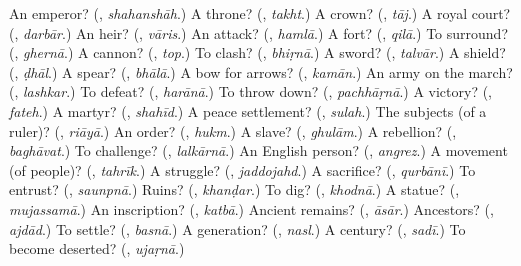 \begin{tcolorbox}[breakable,colback=teal!4,colframe=teal!35!black,title={Before you move on}]
An emperor? (\textbf{}, \emph{shahanshāh}.) A throne? (\textbf{}, \emph{takht}.) A crown? (\textbf{}, \emph{tāj}.) A royal court? (\textbf{}, \emph{darbār}.) An heir? (\textbf{}, \emph{vāris}.) An attack? (\textbf{}, \emph{hamlā}.) A fort? (\textbf{}, \emph{qilā}.) To surround? (\textbf{}, \emph{ghernā}.) A cannon? (\textbf{}, \emph{top}.) To clash? (\textbf{}, \emph{bhiṛnā}.) A sword? (\textbf{}, \emph{talvār}.) A shield? (\textbf{}, \emph{ḍhāl}.) A spear? (\textbf{}, \emph{bhālā}.) A bow for arrows? (\textbf{}, \emph{kamān}.) An army on the march? (\textbf{}, \emph{lashkar}.) To defeat? (\textbf{}, \emph{harānā}.) To throw down? (\textbf{}, \emph{pachhāṛnā}.) A victory? (\textbf{}, \emph{fateh}.) A martyr? (\textbf{}, \emph{shahīd}.) A peace settlement? (\textbf{}, \emph{sulah}.) The subjects (of a ruler)? (\textbf{}, \emph{riāyā}.) An order? (\textbf{}, \emph{hukm}.) A slave? (\textbf{}, \emph{ghulām}.) A rebellion? (\textbf{}, \emph{baghāvat}.) To challenge? (\textbf{}, \emph{lalkārnā}.) An English person? (\textbf{}, \emph{angrez}.) A movement (of people)? (\textbf{}, \emph{tahrīk}.) A struggle? (\textbf{}, \emph{jaddojahd}.) A sacrifice? (\textbf{}, \emph{qurbānī}.) To entrust? (\textbf{}, \emph{saunpnā}.) Ruins? (\textbf{}, \emph{khanḍar}.) To dig? (\textbf{}, \emph{khodnā}.) A statue? (\textbf{}, \emph{mujassamā}.) An inscription? (\textbf{}, \emph{katbā}.) Ancient remains? (\textbf{}, \emph{āsār}.) Ancestors? (\textbf{}, \emph{ajdād}.) To settle? (\textbf{}, \emph{basnā}.) A generation? (\textbf{}, \emph{nasl}.) A century? (\textbf{}, \emph{sadī}.) To become deserted? (\textbf{}, \emph{ujaṛnā}.)
\end{tcolorbox}
